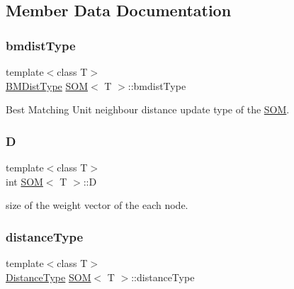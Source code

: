 \subsection{Member Data Documentation}
\mbox{\label{class_s_o_m_a8d02f1179ca154170fd3bf349a112706}} 
\subsubsection{\texorpdfstring{bmdist\+Type}{bmdistType}}
{\footnotesize\ttfamily template$<$class T$>$ \\
\mbox{\hyperlink{_s_o_m_8h_a55f65662fc7b41a21c646e37b51ae9d9}{B\+M\+Dist\+Type}} \mbox{\hyperlink{class_s_o_m}{S\+OM}}$<$ T $>$\+::bmdist\+Type\hspace{0.3cm}{\ttfamily [private]}}



Best Matching Unit neighbour distance update type of the \mbox{\hyperlink{class_s_o_m}{S\+OM}}. 

\mbox{\label{class_s_o_m_a125c2393ee9e0f75a42bd03db31a2f15}} 
\subsubsection{\texorpdfstring{D}{D}}
{\footnotesize\ttfamily template$<$class T$>$ \\
int \mbox{\hyperlink{class_s_o_m}{S\+OM}}$<$ T $>$\+::D\hspace{0.3cm}{\ttfamily [private]}}



size of the weight vector of the each node. 

\mbox{\label{class_s_o_m_a2cdff72776415d723fba0e90b7df5bc8}} 
\subsubsection{\texorpdfstring{distance\+Type}{distanceType}}
{\footnotesize\ttfamily template$<$class T$>$ \\
\mbox{\hyperlink{_s_o_m_8h_a69503914f8053c00b814b3096e784d72}{Distance\+Type}} \mbox{\hyperlink{class_s_o_m}{S\+OM}}$<$ T $>$\+::distance\+Type\hspace{0.3cm}{\ttfamily [private]}}



